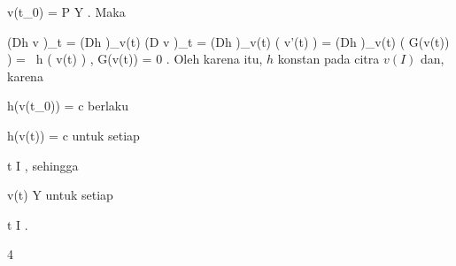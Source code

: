 {\mavergleichskette
{\vergleichskette
{ v(t_0)
}
{ = }{ P
}
{ \in }{ Y
}
{    }{
}
{   }{
}
}
{}{}{.}
Maka

\mavergleichskettealign
{\vergleichskettealign
{ \left(Dh \circ v \right)_{t}
}
{ =} { \left(Dh  \right)_{v(t)} \circ  \left(D v \right)_{t}
}
{ =} { \left(Dh  \right)_{v(t)}  \left(  v'(t)  \right)
}
{ =} { \left(Dh  \right)_{v(t)}  \left(  G(v(t))  \right)
}
{ =} { \left\langle
{} \,  h  ( v(t) )  ,  G(v(t))    \right\rangle
}
}
{
\vergleichskettefortsetzungalign
{ =} { 0
}
{ } {}
{ } {}
{ } {}
}
{}{.}
Oleh karena itu, $h$ konstan pada citra $v( I)$ dan, karena

\mavergleichskette
{\vergleichskette
{ h(v(t_0))
}
{ = }{ c
}
{  }{
}
{    }{
}
{   }{
}
}
{}{}{}
berlaku

\mavergleichskette
{\vergleichskette
{ h(v(t))
}
{ = }{ c
}
{  }{
}
{    }{
}
{   }{
}
}
{}{}{}
untuk setiap

\mavergleichskette
{\vergleichskette
{ t
}
{ \in }{ I
}
{  }{
}
{    }{
}
{   }{
}
}
{}{}{,}
sehingga

\mavergleichskette
{\vergleichskette
{ v(t)
}
{ \in }{ Y
}
{  }{
}
{    }{
}
{   }{
}
}
{}{}{}
untuk setiap

\mavergleichskette
{\vergleichskette
{ t
}
{ \in }{ I
}
{  }{
}
{    }{
}
{   }{
}
}
{}{}{.}

 }



{4}

